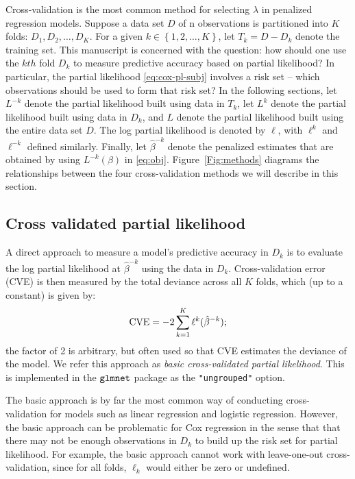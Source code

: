 \par Cross-validation is the most common method for selecting $\lambda$ in penalized regression models. Suppose a data set $D$ of n observations is partitioned into $K$ folds: $D_{1}, D_{2}, \ldots, D_{K}$. For a given $k \in \left\{1,2,\ldots, K\right\}$, let $T_{k} = D - D_{k}$ denote the training set. This manuscript is concerned with the question: how should one use the $kth$ fold $D_{k}$ to measure predictive accuracy based on partial likelihood? In particular, the partial likelihood \eqref{eq:cox-pl-subj} involves a risk set -- which observations should be used to form that risk set?  In the following sections, let $L^{-k}$ denote the partial likelihood built using data in $T_k$, let $L^{k}$ denote the partial likelihood built using data in $D_k$, and $L$ denote the partial likelihood built using the entire data set $D$.  The log partial likelihood is denoted by $\ell$, with $\ell^k$ and $\ell^{-k}$ defined similarly. Finally, let $\hat{\beta}^{-k}$ denote the penalized estimates that are obtained by using $L^{-k}(\beta)$ in \eqref{eq:obj}.  Figure~\ref{Fig:methods} diagrams the relationships between the four cross-validation methods we will describe in this section.

\subsection{Cross validated partial likelihood} 
\label{Sec:cox-cv-existing}

\par A direct approach to measure a model's predictive accuracy in $D_k$ is to evaluate the log partial likelihood at $\hat{\beta}^{-k}$ using the data in $D_k$. Cross-validation error (CVE) is then measured by the total deviance across all $K$ folds, which (up to a constant) is given by:
\begin{equation}
  \label{eq:basic}
  \textrm{CVE} = -2 \sum_{k=1}^{K} \ell^{k}(\hat{\beta}^{-k});
\end{equation}
the factor of 2 is arbitrary, but often used so that CVE estimates the deviance of the model.
We refer this approach as \emph{basic cross-validated partial likelihood}. This is implemented in the $\tt{glmnet}$ package as the \verb|"ungrouped"| option.

\par The basic approach is by far the most common way of conducting cross-validation for models such as linear regression and logistic regression. However, the basic approach can be problematic for Cox regression in the sense that that there may not be enough observations in $D_k$ to build up the risk set for partial likelihood. For example, the basic approach cannot work with leave-one-out cross-validation, since for all folds, $\ell_k$ would either be zero or undefined.


